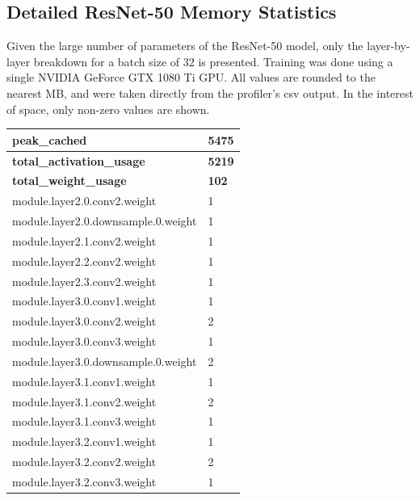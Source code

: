 \documentclass[12pt,letterpaper]{article}
\begin{document}
\newpage
\begin{appendices}


\section{Detailed ResNet-50 Memory Statistics}
Given the large number of parameters of the ResNet-50 model, only the layer-by-layer breakdown for a batch size of 32 is presented. Training was done using a single NVIDIA GeForce GTX 1080 Ti GPU. All values are rounded to the nearest MB, and were taken directly from the profiler's csv output. In the interest of space, only non-zero values are shown.
\begin{longtable}{@{}ll@{}}
\toprule
\textbf{peak\_cached}                              & \textbf{5475} \\ \midrule
\textbf{total\_activation\_usage}                  & \textbf{5219} \\ \midrule
\textbf{total\_weight\_usage }                     & \textbf{102}  \\ \midrule
module.layer2.0.conv2.weight              & 1    \\ \midrule
module.layer2.0.downsample.0.weight       & 1    \\ \midrule
module.layer2.1.conv2.weight              & 1    \\ \midrule
module.layer2.2.conv2.weight              & 1    \\ \midrule
module.layer2.3.conv2.weight              & 1    \\ \midrule
module.layer3.0.conv1.weight              & 1    \\ \midrule
module.layer3.0.conv2.weight              & 2    \\ \midrule
module.layer3.0.conv3.weight              & 1    \\ \midrule
module.layer3.0.downsample.0.weight       & 2    \\ \midrule
module.layer3.1.conv1.weight              & 1    \\ \midrule
module.layer3.1.conv2.weight              & 2    \\ \midrule
module.layer3.1.conv3.weight              & 1    \\ \midrule
module.layer3.2.conv1.weight              & 1    \\ \midrule
module.layer3.2.conv2.weight              & 2    \\ \midrule
module.layer3.2.conv3.weight              & 1    \\ \midrule

\end{longtable}
\end{appendices}
\end{document}
